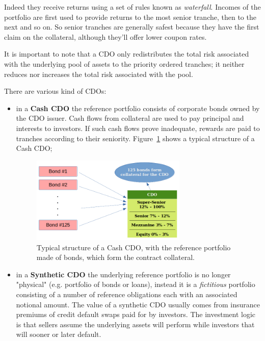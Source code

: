 Indeed they receive returns using a set of rules known as \emph{waterfall}. Incomes of the portfolio are first used to provide returns to the most senior tranche, then to the next and so on. So senior tranches are generally safest because they have the first claim on the collateral, although they'll offer lower coupon rates.

It is important to note that a CDO only redistributes the total risk associated with the underlying pool of assets to the priority ordered tranches; it neither reduces nor increases the total risk associated with the pool.

There are various kind of CDOs:
\begin{itemize}
\item in a \textbf{Cash CDO} the reference portfolio consists of corporate bonds owned by the CDO issuer. Cash flows from collateral are used to pay principal and interests to investors. If such cash flows prove inadequate, rewards are paid to tranches according to their seniority. Figure~\ref{fig:cdo_structure} shows a typical structure of a Cash CDO;

\begin{figure}[htb]
\centering
\includegraphics[width=0.7\textwidth]{figures/cdo_structure}
\caption{Typical structure of a Cash CDO, with the reference portfolio made of bonds, which form the contract collateral.}
\label{fig:cdo_structure}
\end{figure}

\item in a \textbf{Synthetic CDO} the underlying reference portfolio is no longer "physical" (e.g. portfolio of bonds or loans), instead it is a \emph{fictitious} portfolio consisting of a number of reference obligations each with an associated notional amount. The value of a synthetic CDO usually comes from insurance premiums of credit default swaps paid for by investors. The investment logic is that sellers assume the underlying assets will perform while investors that will sooner or later default.
\end{itemize}

